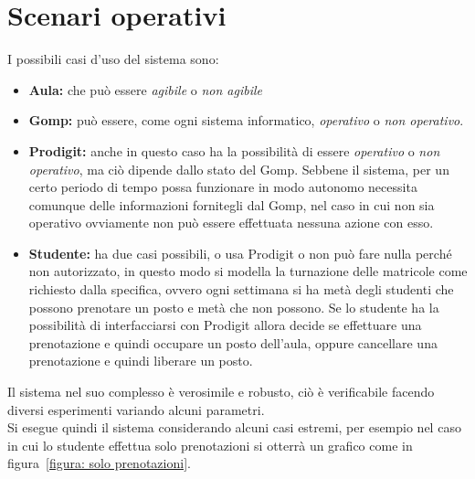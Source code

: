\chapter*{Scenari operativi}
I possibili casi d’uso del sistema sono:
\begin{itemize}
\item \textbf{Aula:} che può essere \textit{agibile} o \textit{non agibile}
\item \textbf{Gomp:}  può essere, come ogni sistema informatico, \textit{operativo} o \textit{non operativo}.
\item \textbf{Prodigit:} anche in questo caso ha la possibilità di essere \textit{operativo} o \textit{non operativo}, ma ciò dipende dallo stato del Gomp. Sebbene il sistema, per un certo periodo di tempo possa funzionare in modo autonomo necessita comunque delle informazioni fornitegli dal Gomp, nel caso in cui non sia operativo ovviamente non può essere effettuata nessuna azione con esso.
\item \textbf{Studente:} ha due casi possibili, o usa Prodigit o non può fare nulla perché non autorizzato, in questo modo si modella la turnazione delle matricole come richiesto dalla specifica, ovvero ogni settimana si ha metà degli studenti che possono prenotare un posto e metà che non possono.
Se lo studente ha la possibilità di interfacciarsi con Prodigit allora decide se effettuare una prenotazione e quindi occupare un posto dell’aula, oppure cancellare una prenotazione e quindi liberare un posto.
\end{itemize}

Il sistema nel suo complesso è verosimile e robusto,  ciò è verificabile facendo diversi esperimenti variando  alcuni parametri. \\
Si esegue quindi il sistema considerando alcuni casi estremi, per esempio nel caso in cui lo studente effettua solo prenotazioni si otterrà un grafico come in figura~\ref{figura: solo prenotazioni}.


